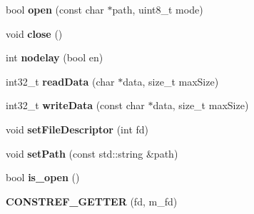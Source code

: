 \begin{DoxyCompactItemize}
\item 
bool {\bfseries open} (const char $\ast$path, uint8\+\_\+t mode)\hypertarget{classgxx_1_1io_1_1fdfile_a4385f6258e930936490b1783409e7064}{}\label{classgxx_1_1io_1_1fdfile_a4385f6258e930936490b1783409e7064}

\item 
void {\bfseries close} ()\hypertarget{classgxx_1_1io_1_1fdfile_a17938c189c1daf14bb540043ee0bb949}{}\label{classgxx_1_1io_1_1fdfile_a17938c189c1daf14bb540043ee0bb949}

\item 
int {\bfseries nodelay} (bool en)\hypertarget{classgxx_1_1io_1_1fdfile_af1f04e5ea0f802ed249e7e70f22e640a}{}\label{classgxx_1_1io_1_1fdfile_af1f04e5ea0f802ed249e7e70f22e640a}

\item 
int32\+\_\+t {\bfseries read\+Data} (char $\ast$data, size\+\_\+t max\+Size)\hypertarget{classgxx_1_1io_1_1fdfile_aab55e428338784966263ce9311c752ea}{}\label{classgxx_1_1io_1_1fdfile_aab55e428338784966263ce9311c752ea}

\item 
int32\+\_\+t {\bfseries write\+Data} (const char $\ast$data, size\+\_\+t max\+Size)\hypertarget{classgxx_1_1io_1_1fdfile_aa6b10070a559b46de324b6a01e7ef7d5}{}\label{classgxx_1_1io_1_1fdfile_aa6b10070a559b46de324b6a01e7ef7d5}

\item 
void {\bfseries set\+File\+Descriptor} (int fd)\hypertarget{classgxx_1_1io_1_1fdfile_a0c30dc106a3dada39e830a2f39a11fed}{}\label{classgxx_1_1io_1_1fdfile_a0c30dc106a3dada39e830a2f39a11fed}

\item 
void {\bfseries set\+Path} (const std\+::string \&path)\hypertarget{classgxx_1_1io_1_1fdfile_a81648e82fc9d5430fb67f8e2ec74c6e6}{}\label{classgxx_1_1io_1_1fdfile_a81648e82fc9d5430fb67f8e2ec74c6e6}

\item 
bool {\bfseries is\+\_\+open} ()\hypertarget{classgxx_1_1io_1_1fdfile_afc7c22aef521c4466e4c6d19a40afd5e}{}\label{classgxx_1_1io_1_1fdfile_afc7c22aef521c4466e4c6d19a40afd5e}

\item 
{\bfseries C\+O\+N\+S\+T\+R\+E\+F\+\_\+\+G\+E\+T\+T\+ER} (fd, m\+\_\+fd)\hypertarget{classgxx_1_1io_1_1fdfile_acdee1a0d8c4f6ea45734ec8a421da42d}{}\label{classgxx_1_1io_1_1fdfile_acdee1a0d8c4f6ea45734ec8a421da42d}

\end{DoxyCompactItemize}
